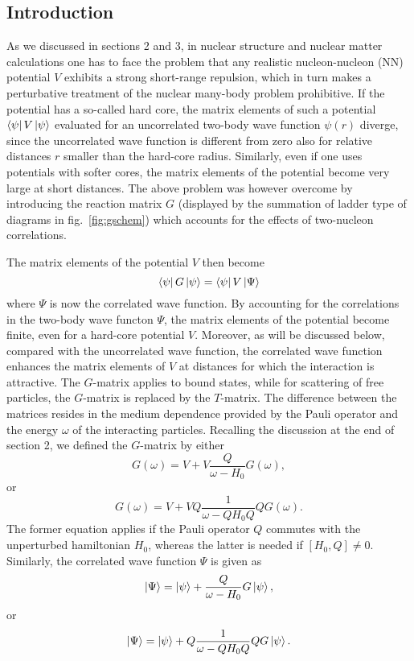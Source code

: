 
\subsection{Introduction}
As we discussed in sections 2 and 3,
in nuclear structure and nuclear matter calculations one has to
face the problem that any realistic nucleon-nucleon (NN) potential $V$
exhibits a strong short-range repulsion, which in turn makes
a perturbative treatment of the nuclear many-body problem
prohibitive. If the potential has a so-called hard core,
the matrix elements of such a potential $\left\langle \psi \right|V\left| \psi \right\rangle$
evaluated
for an uncorrelated two-body wave function $\psi (r)$ diverge,
since the uncorrelated wave function is different from zero also for
relative distances $r$ smaller than the hard-core radius. Similarly,
even if one uses potentials with softer cores, the matrix elements of the
potential become very large at short distances.
The above problem was however overcome by
introducing the reaction matrix $G$ (displayed by  the summation
of ladder type of diagrams in fig.\ \ref{fig:gschem})
which accounts for the
effects of two-nucleon correlations.

The matrix elements of the
potential $V$ then become
\begin{equation}
\left\langle \psi \right|G\left| \psi \right\rangle =\left\langle \psi \right|V\left| \Psi \right\rangle
\end{equation}
where $\Psi$ is now the correlated wave function. By accounting for the
correlations in the two-body wave functon $\Psi$, the matrix elements of
the potential become finite, even for a hard-core potential $V$. Moreover,
as will be discussed below, compared with the uncorrelated
wave function, the correlated wave function enhances the
matrix elements of $V$ at distances for which the interaction is
attractive.
The $G$-matrix applies to bound states, while  for scattering of free particles, 
the 
$G$-matrix is replaced by the $T$-matrix. The difference between the matrices
resides in the medium dependence provided by the Pauli operator and 
the energy $\omega$ of the interacting particles.
Recalling the discussion at the end of section 2, we defined the
$G$-matrix by either
\begin{equation}
   G(\omega )=V+V\frac{Q}{\omega -H_0}G(\omega ),
   \label{eq:g1}
\end{equation}
or
\begin{equation}
   G(\omega )=V+VQ\frac{1}{\omega -QH_0Q}QG(\omega ).
      \label{eq:g2}
\end{equation}
The former equation applies if the Pauli operator $Q$  commutes
with the unperturbed hamiltonian $H_0$, whereas the latter is
needed if $[H_0,Q]\neq 0$.
Similarly, the correlated wave function $\Psi$
is given as
\begin{equation}
    \left| \Psi \right\rangle=\left| \psi \right\rangle+\frac{Q}{\omega - H_0}G\left| \psi \right\rangle,
    \label{eq:wave}
\end{equation}
or
\begin{equation}
   \left| \Psi \right\rangle=\left| \psi \right\rangle+Q\frac{1}{\omega - QH_0Q}QG\left| \psi \right\rangle.
\end{equation}

